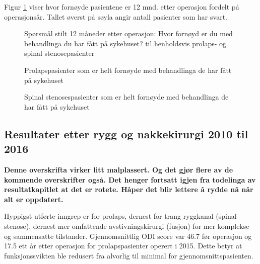 \documentclass [norsk,a4paper,twoside]{article}\usepackage[]{graphicx}\usepackage[]{color}
\begin{document}
Figur \ref{fig:Fornoyd} viser hvor fornøyde pasientene er 12 mnd. 
etter operasjon fordelt på operasjonsår. Tallet øverst på søyla angir antall pasienter som har svart. 




\begin{figure}[h] 
\begin{center}
\end{center}
\caption{Spørsmål stilt 12 måneder etter operasjon: Hvor fornøyd er du med behandlinga du har fått på sykehuset? til henholdsvis prolaps- og spinal stenosepasienter}
\label{fig:Fornoyd}
\end{figure}

\begin{figure}[h] 
\centerline{}
\caption{Prolapspasienter som er helt fornøyde med behandlinga de har fått på sykehuset}
\label{fig:FornoydAvdPro}
\end{figure}

\begin{figure}[h] 
\centerline{}
\caption{Spinal stenosespasienter som er helt fornøyde med behandlinga de har fått på sykehuset}
\label{fig:FornoydAvdSS}
\end{figure}


\subsection{ Resultater etter rygg og nakkekirurgi 2010 til 2016}
\textbf{Denne overskrifta virker litt malplassert. Og det gjør flere av de kommende overskrifter også. Det henger fortsatt igjen fra todelinga av resultatkapitlet at det er rotete. Håper det blir lettere å rydde nå når alt er oppdatert.}



Hyppigst utførte inngrep er for prolaps, dernest for trang ryggkanal (spinal stenose),
dernest mer omfattende avstivningskirurgi (fusjon) for mer komplekse og
sammensatte tilstander. 
Gjennomsnittlig ODI score var 46.7 før operasjon og 17.5 ett år etter
operasjon for prolapspasienter operert i 2015. Dette betyr at funksjonssvikten ble redusert fra alvorlig til minimal for gjennomsnittspasienten. \\
\end{document}
